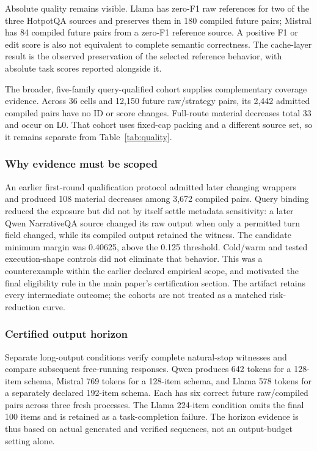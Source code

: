 Absolute quality remains visible. Llama has zero-F1 raw references for two of the three HotpotQA sources and preserves them in 180 compiled future pairs; Mistral has 84 compiled future pairs from a zero-F1 reference source. A positive F1 or edit score is also not equivalent to complete semantic correctness. The cache-layer result is the observed preservation of the selected reference behavior, with absolute task scores reported alongside it.

The broader, five-family query-qualified cohort supplies complementary coverage evidence. Across 36 cells and 12,150 future raw/strategy pairs, its 2,442 admitted compiled pairs have no ID or score changes. Full-route material decreases total 33 and occur on L0. That cohort uses fixed-cap packing and a different source set, so it remains separate from Table~\ref{tab:quality}.

\subsubsection{Why evidence must be scoped}
An earlier first-round qualification protocol admitted later changing wrappers and produced 108 material decreases among 3,672 compiled pairs. Query binding reduced the exposure but did not by itself settle metadata sensitivity: a later Qwen NarrativeQA source changed its raw output when only a permitted turn field changed, while its compiled output retained the witness. The candidate minimum margin was 0.40625, above the 0.125 threshold. Cold/warm and tested execution-shape controls did not eliminate that behavior. This was a counterexample within the earlier declared empirical scope, and motivated the final eligibility rule in the main paper's certification section. The artifact retains every intermediate outcome; the cohorts are not treated as a matched risk-reduction curve.

\subsubsection{Certified output horizon}
Separate long-output conditions verify complete natural-stop witnesses and compare subsequent free-running responses. Qwen produces 642 tokens for a 128-item schema, Mistral 769 tokens for a 128-item schema, and Llama 578 tokens for a separately declared 192-item schema. Each has six correct future raw/compiled pairs across three fresh processes. The Llama 224-item condition omits the final 100 items and is retained as a task-completion failure. The horizon evidence is thus based on actual generated and verified sequences, not an output-budget setting alone.

